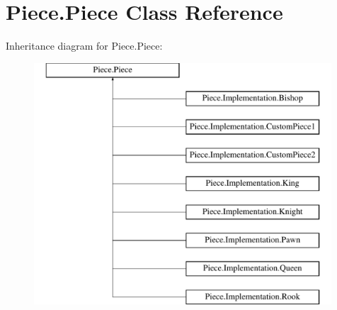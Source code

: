 \hypertarget{classPiece_1_1Piece}{\section{Piece.\-Piece Class Reference}
\label{classPiece_1_1Piece}
}
Inheritance diagram for Piece.\-Piece\-:\begin{figure}[H]
\begin{center}
\leavevmode
\includegraphics[height=9.000000cm]{classPiece_1_1Piece}
\end{center}
\end{figure}
